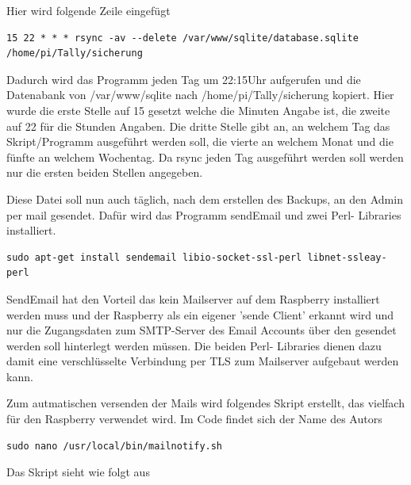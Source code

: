 \documentclass[11pt,a4paper]{article} %
\begin{document}
Hier wird folgende Zeile eingefügt
\begin{frame}

\begin{lstlisting}
15 22 * * * rsync -av --delete /var/www/sqlite/database.sqlite  /home/pi/Tally/sicherung
\end{lstlisting}
\end{frame}
Dadurch wird das Programm jeden Tag um 22:15Uhr aufgerufen und die Datenabank von /var/www/sqlite nach /home/pi/Tally/sicherung  kopiert. Hier wurde die erste Stelle auf 15 gesetzt welche die Minuten Angabe ist, die zweite auf 22 für die Stunden Angaben. Die dritte Stelle gibt an, an welchem Tag das Skript/Programm ausgeführt werden soll, die vierte an welchem Monat und die fünfte an welchem Wochentag. Da rsync jeden Tag ausgeführt werden soll werden nur die ersten beiden Stellen angegeben.
\par
Diese Datei soll nun auch täglich, nach dem erstellen des Backups, an den Admin per mail gesendet.
Dafür wird das Programm sendEmail und zwei Perl- Libraries installiert.
\begin{frame}

\begin{lstlisting}
sudo apt-get install sendemail libio-socket-ssl-perl libnet-ssleay-perl
\end{lstlisting}
\end{frame}
SendEmail hat den Vorteil das kein Mailserver auf dem Raspberry installiert werden muss und der Raspberry als ein eigener 'sende Client' erkannt wird und nur die Zugangsdaten zum SMTP-Server des Email Accounts über den gesendet werden soll hinterlegt werden müssen. Die beiden Perl- Libraries dienen dazu damit eine verschlüsselte Verbindung per TLS zum Mailserver aufgebaut werden kann.
\par
Zum autmatischen versenden der Mails wird folgendes Skript erstellt, das vielfach für den Raspberry verwendet wird. Im Code findet sich der Name des Autors \cite{8}
\begin{frame}

\begin{lstlisting}
sudo nano /usr/local/bin/mailnotify.sh
\end{lstlisting}
\end{frame}
\newpage
Das Skript sieht wie folgt aus
\end{document}
